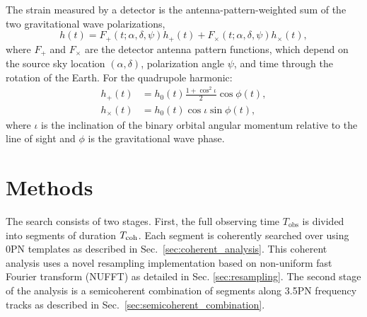 \documentclass[aps,prd,amsmath,floats,floatfix, twocolumn,
superscriptaddress,nofootinbib,showpacs]{revtex4-2}
\newcommand{\ls}[1]{\textcolor{red}{[LS: #1]}}
\begin{document}
The strain measured by a detector is the antenna-pattern-weighted sum of the two gravitational wave polarizations,
\begin{equation}
    h(t) = F_+(t;\alpha,\delta,\psi) h_+(t) 
    + F_\times(t;\alpha,\delta,\psi) h_\times(t) ,
    \label{eq:detector_response}
\end{equation}
where $F_+$ and $F_\times$ are the detector antenna pattern functions, which depend on the source sky location $(\alpha,\delta)$, polarization angle $\psi$, and time through the rotation of the Earth. For the quadrupole harmonic:
\begin{align}
    h_+(t) &= h_0(t) \frac{1+\cos^2\iota}{2} \cos\phi(t), \\
    h_\times(t) &= h_0(t) \cos\iota \sin\phi(t),
\end{align}
where $\iota$ is the inclination of the binary orbital angular momentum relative to the line of sight and $\phi$ is the gravitational wave phase.


\section{Methods}
\label{sec:methods}
The search consists of two stages.  First, the full observing time $T_\mathrm{obs}$ is divided into segments of duration $T_{\rm coh}$. Each segment is coherently searched over using 0PN templates as described in Sec.~\ref{sec:coherent_analysis}. This coherent analysis uses a novel resampling implementation based on non-uniform fast Fourier transform (NUFFT) as detailed in Sec. \ref{sec:resampling}. The second stage of the analysis is a semicoherent combination of segments along 3.5PN frequency tracks as described in Sec.~\ref{sec:semicoherent_combination}. 

\end{document}
